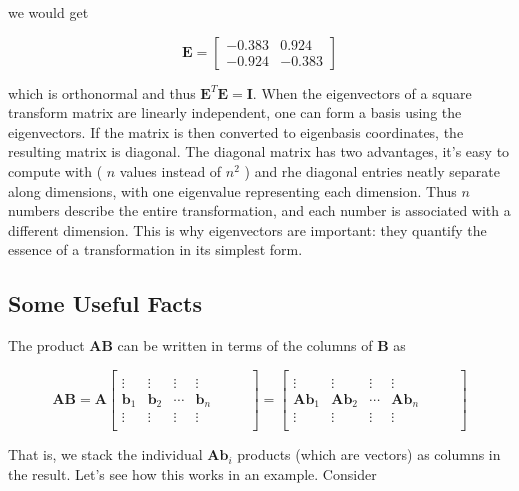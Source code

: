 \documentclass[main.tex]{subfiles}
\begin{document}
    we would get
    
    $$
    \mathbf{E}=\left[\begin{array}{cc}
    -0.383 & 0.924 \\
    -0.924 & -0.383
    \end{array}\right]
    $$

    which is orthonormal and thus $\mathbf{E}^{T} \mathbf{E}=\mathbf{I}$. When the eigenvectors of a square transform matrix are linearly independent, one can form a basis using the eigenvectors. If the matrix is then converted to eigenbasis coordinates, the resulting matrix is diagonal. The diagonal matrix has two advantages, it's easy to compute with ( $n$ values instead of $n^{2}$ ) and rhe diagonal entries neatly separate along dimensions, with one eigenvalue representing each dimension. Thus $n$ numbers describe the entire transformation, and each number is associated with a different dimension. This is why eigenvectors are important: they quantify the essence of a transformation in its simplest form.
    
\subsection{Some Useful Facts}

The product $\mathbf{A B}$ can be written in terms of the columns of $\mathbf{B}$ as

$$
\mathbf{A B}=\mathbf{A}\left[\begin{array}{cccc} 
& & & \\
\vdots & \vdots & \vdots & \vdots \\
\mathbf{b}_{1} & \mathbf{b}_{2} & \cdots & \mathbf{b}_{n} \\
\vdots & \vdots & \vdots & \vdots
& & & \\
\end{array}\right]=\left[\begin{array}{cccc} 
& & & \\
\vdots & \vdots & \vdots & \vdots \\
\mathbf{A} \mathbf{b}_{1} & \mathbf{A} \mathbf{b}_{2} & \cdots & \mathbf{A} \mathbf{b}_{n} \\
\vdots & \vdots & \vdots & \vdots
& & & \\
\end{array}\right]
$$

That is, we stack the individual $\mathbf{A} \mathbf{b}_{i}$ products (which are vectors) as columns in the result. Let's see how this works in an example. Consider
\end{document}
